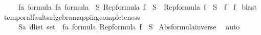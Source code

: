 \begin{isabellebody}
\ \ \ \ {\isachardoublequoteopen}{\isasymforall}\ {\isacharparenleft}fa\ formula{\isacharparenright}\ {\isacharparenleft}fa\ formula{\isacharparenright}{\isachardot}\ {\isasymexists}\ S{\isachardot}\ {\isacharparenleft}{\isacharparenleft}Rep{\isacharunderscore}formula\ f\ {\isacharequal}\ S\ {\isasymand}\ Rep{\isacharunderscore}formula\ f\ {\isacharequal}\ S{\isacharparenright}\ {\isasymlongleftrightarrow}\ f\ {\isacharequal}\ f\isanewline
%
\isadelimproof
%
\endisadelimproof
%
\isatagproof
{}\isamarkupfalse%
\ blast%
\endisatagproof
{\isafoldproof}%
%
\isadelimproof
\isanewline
%
\endisadelimproof
\isanewline
{}\isamarkupfalse%
\ temporal{\isacharunderscore}faults{\isacharunderscore}algebra{\isacharunderscore}mapping{\isacharunderscore}completeness{\isacharcolon}\ \isanewline
\ \ \ \ {\isachardoublequoteopen}{\isasymforall}\ {\isacharparenleft}S{\isacharcolon}{\isacharcolon}{\isacharprime}a\ dlist\ set{\isacharparenright}{\isachardot}\ {\isasymexists}\ f{\isacharcolon}{\isacharcolon}{\isacharprime}a\ formula{\isachardot}\ Rep{\isacharunderscore}formula\ f\ {\isacharequal}\ S{\isachardoublequoteclose}\isanewline
%
\isadelimproof
%
\endisadelimproof
%
\isatagproof
{}\isamarkupfalse%
\ Abs{\isacharunderscore}formula{\isacharunderscore}inverse\ \isamarkupfalse%
\ auto\isanewline
\isanewline
%
\endisatagproof
{\isafoldproof}%
%
\isadelimproof
%
\endisadelimproof
%
\isadelimtheory
%
\endisadelimtheory
%
\isatagtheory
%
\endisatagtheory
{\isafoldtheory}%
%
\isadelimtheory
%
\endisadelimtheory
%
\end{isabellebody}%
